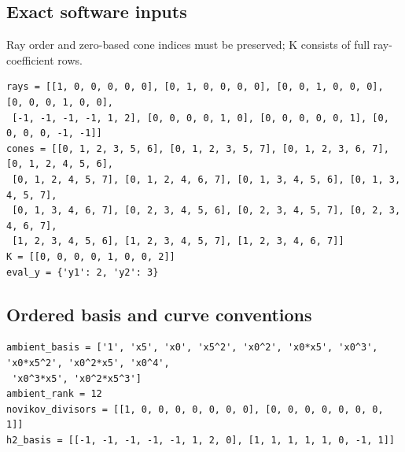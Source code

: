 \documentclass[10pt,a4paper]{article}
\begin{document}
\subsection*{Exact software inputs}
Ray order and zero-based cone indices must be preserved; K consists of full ray-coefficient rows.
\begin{lstlisting}
rays = [[1, 0, 0, 0, 0, 0], [0, 1, 0, 0, 0, 0], [0, 0, 1, 0, 0, 0], [0, 0, 0, 1, 0, 0],
 [-1, -1, -1, -1, 1, 2], [0, 0, 0, 0, 1, 0], [0, 0, 0, 0, 0, 1], [0, 0, 0, 0, -1, -1]]
cones = [[0, 1, 2, 3, 5, 6], [0, 1, 2, 3, 5, 7], [0, 1, 2, 3, 6, 7], [0, 1, 2, 4, 5, 6],
 [0, 1, 2, 4, 5, 7], [0, 1, 2, 4, 6, 7], [0, 1, 3, 4, 5, 6], [0, 1, 3, 4, 5, 7],
 [0, 1, 3, 4, 6, 7], [0, 2, 3, 4, 5, 6], [0, 2, 3, 4, 5, 7], [0, 2, 3, 4, 6, 7],
 [1, 2, 3, 4, 5, 6], [1, 2, 3, 4, 5, 7], [1, 2, 3, 4, 6, 7]]
K = [[0, 0, 0, 0, 1, 0, 0, 2]]
eval_y = {'y1': 2, 'y2': 3}
\end{lstlisting}
\subsection*{Ordered basis and curve conventions}
\begin{lstlisting}
ambient_basis = ['1', 'x5', 'x0', 'x5^2', 'x0^2', 'x0*x5', 'x0^3', 'x0*x5^2', 'x0^2*x5', 'x0^4',
 'x0^3*x5', 'x0^2*x5^3']
ambient_rank = 12
novikov_divisors = [[1, 0, 0, 0, 0, 0, 0, 0], [0, 0, 0, 0, 0, 0, 0, 1]]
h2_basis = [[-1, -1, -1, -1, -1, 1, 2, 0], [1, 1, 1, 1, 1, 0, -1, 1]]
\end{lstlisting}
\end{document}
